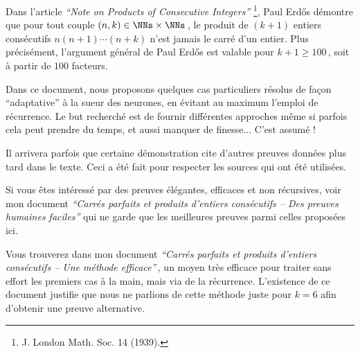 Dans l'article \emph{\enquote{Note on Products of Consecutive Integers}}
\footnote{
	J. London Math. Soc. 14 (1939).
},
Paul Erdős démontre que pour tout couple $(n, k) \in \NNs \times \NNs$\,, le produit de $(k+1)$ entiers consécutifs $n (n + 1) \cdots (n + k)$ n'est jamais le carré d'un entier. 
Plus précisément, l'argument général de Paul Erdős est valable pour $k + 1 \geq 100$\,, soit à partir de $100$ facteurs.

\medskip

Dans ce document, nous proposons quelques cas particuliers résolus de façon \enquote{adaptative} à la sueur des neurones, en évitant au maximum l'emploi de récurrence. Le but recherché est de fournir différentes approches même si parfois cela peut prendre du temps, et aussi manquer de finesse... C'est assumé !


\begin{remark}
	Il arrivera parfois que certaine démonstration cite d'autres preuves données plus tard dans le texte. Ceci a été fait pour respecter les sources qui ont été utilisées.
\end{remark}


\begin{remark}
	Si vous êtes intéressé par des preuves élégantes, efficaces et non récursives, voir mon document \emph{\enquote{Carrés parfaits et produits d'entiers consécutifs -- Des preuves humaines faciles}} qui ne garde que les meilleures preuves parmi celles proposées ici. 
\end{remark}


\begin{remark}
	Vous trouverez dans mon document \emph{\enquote{Carrés parfaits et produits d'entiers consécutifs -- Une méthode efficace}}\,, un moyen très efficace pour traiter sans effort les premiers cas à la main, mais via de la récurrence.
	L'existence de ce document justifie que nous ne parlions de cette méthode juste pour $k = 6$ afin d'obtenir une preuve alternative.
\end{remark}
